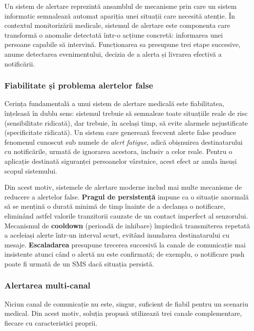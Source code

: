﻿\documentclass[12pt,a4paper,twoside]{article}
\begin{document}
Un sistem de alertare reprezintă ansamblul de mecanisme prin care un sistem informatic semnalează automat apariția unei situații care necesită atenție. În contextul monitorizării medicale, sistemul de alertare este componenta care transformă o anomalie detectată într-o acțiune concretă: informarea unei persoane capabile să intervină. Funcționarea sa presupune trei etape succesive, anume detectarea evenimentului, decizia de a alerta și livrarea efectivă a notificării.

\subsubsection{Fiabilitate și problema alertelor false}

Cerința fundamentală a unui sistem de alertare medicală este fiabilitatea, înțeleasă în dublu sens: sistemul trebuie să semnaleze toate situațiile reale de risc (sensibilitate ridicată), dar trebuie, în același timp, să evite alarmele nejustificate (specificitate ridicată). Un sistem care generează frecvent alerte false produce fenomenul cunoscut sub numele de \textit{alert fatigue}, adică obișnuirea destinatarului cu notificările, urmată de ignorarea acestora, inclusiv a celor reale. Pentru o aplicație destinată siguranței persoanelor vârstnice, acest efect ar anula însuși scopul sistemului.

Din acest motiv, sistemele de alertare moderne includ mai multe mecanisme de reducere a alertelor false. \textbf{Pragul de persistență} impune ca o situație anormală să se mențină o durată minimă de timp înainte de a declanșa o notificare, eliminând astfel valorile tranzitorii cauzate de un contact imperfect al senzorului. Mecanismul de \textbf{cooldown} (perioadă de inhibare) împiedică transmiterea repetată a aceleiași alerte într-un interval scurt, evitând inundarea destinatarului cu mesaje. \textbf{Escaladarea} presupune trecerea succesivă la canale de comunicație mai insistente atunci când o alertă nu este confirmată; de exemplu, o notificare push poate fi urmată de un SMS dacă situația persistă.

\subsubsection{Alertarea multi-canal}

Niciun canal de comunicație nu este, singur, suficient de fiabil pentru un scenariu medical. Din acest motiv, soluția propusă utilizează trei canale complementare, fiecare cu caracteristici proprii.
\end{document}
